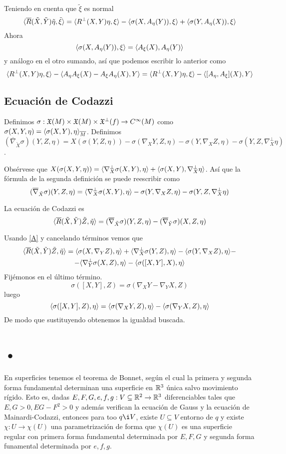 \documentclass[GSR.tex]{subfiles}
\begin{document}
Teniendo en cuenta que $\tilde{\xi}$ es normal
\[
\langle{\overline{R}(\tilde{X},\tilde{Y})\tilde{\eta},\tilde{\xi}}\rangle=\langle{R^\perp(X,Y)\eta,\xi}\rangle-\langle{\sigma(X,A_\eta(Y)),\xi}\rangle+\langle{\sigma(Y,A_\eta(X)),\xi}\rangle
\]
Ahora
\[
\langle{\sigma(X,A_\eta(Y)),\xi}\rangle=\langle{A_\xi(X),A_\eta(Y)}\rangle
\]
y análogo en el otro sumando, así que podemos escribir lo anterior como
\[
\langle{R^\perp(X,Y)\eta,\xi}\rangle-\langle{A_\eta A_\xi(X)-A_\xi A_\eta(X),Y}\rangle=\langle{R^\perp(X,Y)\eta,\xi}\rangle-\langle{[A_\eta,A_\xi](X),Y}\rangle
\]

\subsection{Ecuación de Codazzi}
Definimos $\sigma:{\mathfrak{X}}(M)\times{\mathfrak{X}}(M)\times{\mathfrak{X}}^\perp(f)\to C^\infty(M)$ como $\sigma(X,Y,\eta)=\langle{\sigma(X,Y),\eta}\rangle_{\overline{M}}$. Definimos $(\overline{\nabla}_{\tilde{X}}\sigma)(Y,Z,\eta)=X(\sigma(Y,Z,\eta))-\sigma(\nabla_XY,Z,\eta)-\sigma(Y,\nabla_XZ,\eta)-\sigma(Y,Z,\nabla_X^\perp\eta)$. 

Obsérvese que $X(\sigma(X,Y,\eta))=\langle{\nabla_X^\perp \sigma(X,Y),\eta}\rangle+\langle{\sigma(X,Y),\nabla_X^\perp\eta}\rangle$. Así que la fórmula de la segunda definición se puede reescribir como 
\[
(\overline{\nabla}_{\tilde{X}}\sigma)(Y,Z,\eta)=\langle{\nabla_X^\perp \sigma(X,Y),\eta}\rangle-\sigma(Y,\nabla_XZ,\eta)-\sigma(Y,Z,\nabla_X^\perp\eta)
\]

La ecuación de Codazzi es
\[
\langle{\overline{R}(\tilde{X},\tilde{Y})\tilde{Z},\tilde{\eta}}\rangle=(\overline{\nabla}_{\tilde{X}}\sigma)(Y,Z,\eta)-(\overline{\nabla}_{\tilde{Y}}\sigma)(X,Z,\eta)
\]

Usando \ref{A} y cancelando términos vemos que
\begin{gather*}
\langle{\overline{R}(\tilde{X},\tilde{Y})\tilde{Z},\tilde{\eta}}\rangle=\langle{\sigma(X,\nabla_YZ),\eta}\rangle+\langle{\nabla_X^\perp\sigma(Y,Z),\eta}\rangle-\langle{\sigma(Y,\nabla_XZ),\eta}\rangle-\\
-\langle{\nabla_Y^\perp\sigma(X,Z),\eta}\rangle-\langle{\sigma([X,Y],X),\eta}\rangle
\end{gather*}
Fijémonos en el último término. 
\[
\sigma([X,Y],Z)=\sigma(\nabla_XY-\nabla_YX,Z)
\]
luego
\[
\langle{\sigma([X,Y],Z),\eta}\rangle=\langle{\sigma(\nabla_XY,Z),\eta}\rangle-\langle{\sigma(\nabla_YX,Z),\eta}\rangle
\]
De modo que sustituyendo obtenemos la igualdad buscada. 

\section{•}

En superficies tenemos el teorema de Bonnet, según el cual la primera y segunda forma fundamental determinan una superficie en $\mathbb{R}^3$ única salvo movimiento rígido. Esto es, dadas $E,F,G,e,f,g:V\subseteq\mathbb{R}^2\to\mathbb{R}^3$ diferenciables tales que $E,G>0, EG-F^2>0$ y además verifican la ecuación de Gauss y la ecuación de Mainardi-Codazzi, entonces para too $q\i V$, existe $U\subseteq V$ entorno de $q$ y existe $\chi:U\to\chi(U)$ una parametrización de forma que $\chi(U)$ es una superficie regular con primera forma fundamental determinada por $E,F,G$ y segunda forma funamental determinada por $e,f,g$. 
\end{document}
